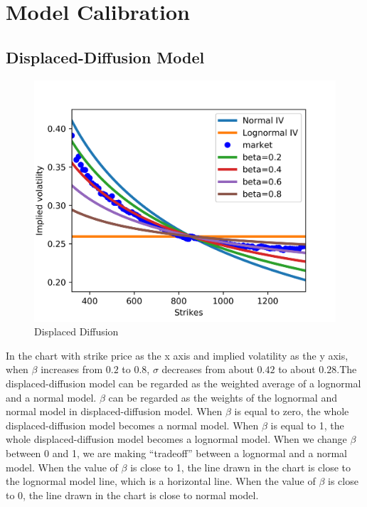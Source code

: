 \documentclass[fleqn,12pt]{SelfArx}
\begin{document}
\onecolumn


\section{Model Calibration}
\subsection{Displaced-Diffusion Model}

\begin{figure}[ht]\centering
	\includegraphics{DD}
	\caption{Displaced Diffusion}
\end{figure}

\noindent In the chart with strike price as the x axis and implied volatility as the y axis, when $\beta$ increases from $0.2$ to $0.8$, $\sigma$ decreases from about $0.42$ to about $0.28$.The displaced-diffusion model can be regarded as the weighted average of a lognormal and a normal model. $\beta$ can be regarded as the weights of the lognormal and normal model in displaced-diffusion model. When $\beta$ is equal to zero, the whole displaced-diffusion model becomes a normal model. When $\beta$ is equal to 1, the whole displaced-diffusion model becomes a lognormal model. When we change $\beta$ between 0 and 1, we are making “tradeoff” between a lognormal and a normal model. When the value of $\beta$ is close to 1, the line drawn in the chart is close to the lognormal model line, which is a horizontal line. When the value of $\beta$ is close to 0, the line drawn in the chart is close to normal model. 
\end{document}
